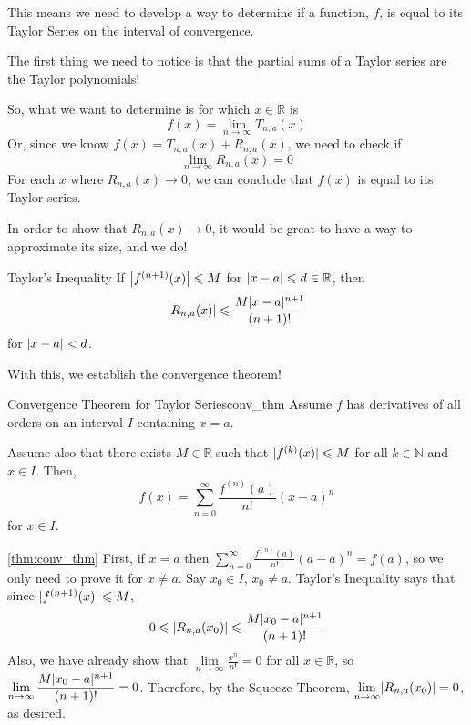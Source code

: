 This means we need to develop a way to determine if a function, $ f $,
is equal to its Taylor Series on the interval of convergence.

The first thing we need to notice is that the partial sums of a
Taylor series are the Taylor polynomials!

So, what we want to determine is for which $ x\in\mathbb{R} $ is
\[ f(x)=\lim\limits_{{n} \to {\infty}} T_{n,a}(x) \]
Or, since we know $ f(x)=T_{n,a}(x) + R_{n,a}(x) $,
we need to check if
\[ \lim\limits_{{n} \to {\infty}} R_{n,a}(x)=0 \]
For each $ x $ where $ R_{n,a}(x)\to 0 $, we can conclude that
$ f(x) $ is equal to its Taylor series.

In order to show that $ R_{n,a}(x)\to 0 $, it would be
great to have a way to approximate
its size, and we do!

\begin{Theorem}{Taylor's Inequality}{}
    If $ \abs*{f^{(n+1)}(x)}\leqslant M $ for $ \abs{x-a}\leqslant d\in\mathbb{R} $,
    then
    \[ \abs{R_{n,a}(x)}\leqslant \frac{M\abs{x-a}^{n+1}}{(n+1)!}  \]
    for $ \abs{x-a}<d $.
\end{Theorem}
With this, we establish the convergence theorem!
\begin{Theorem}{Convergence Theorem for Taylor Series}{conv_thm}
    Assume $ f $ has derivatives of all orders on an interval
    $ I $ containing $ x=a $.

    Assume also that there exists $ M\in\mathbb{R} $ such that
    $ \abs{f^{(k)}(x)}\leqslant M $ for all $ k\in\mathbb{N} $
    and $ x\in I $. Then,
    \[ f(x)=\sum\limits_{n=0}^{\infty} \frac{f^{(n)}(a)}{n!}(x-a)^n \]
    for $ x\in I $.
\end{Theorem}

\begin{Proof}{\ref{thm:conv_thm}}{}
    First, if $ x=a $ then $ \displaystyle \sum\limits_{n=0}^{\infty} \frac{f^{(n)}(a)}{n!}(a-a)^n
        =f(a) $, so we only need to prove it for $ x\neq a $. Say $ x_0\in I $,
    $ x_0\neq a $. Taylor's Inequality says that since $ \abs{f^{(n+1)}(x)}\leqslant M $,
    \[ 0\leqslant \abs{R_{n,a}(x_0)}\leqslant
        \frac{M\abs{x_0-a}^{n+1}}{(n+1)!} \]
    Also, we have already show that $ \displaystyle\lim\limits_{{n} \to {\infty}}\frac{x^n}{n!} =0 $
    for all $ x\in\mathbb{R} $, so $ \displaystyle\lim\limits_{{n} \to {\infty}}
        \frac{M\abs{x_0-a}^{n+1}}{(n+1)!} =0 $. Therefore, by the Squeeze Theorem,
    $ \lim\limits_{{n} \to {\infty}} \abs{R_{n,a}(x_0)}=0 $, as desired.
\end{Proof}

